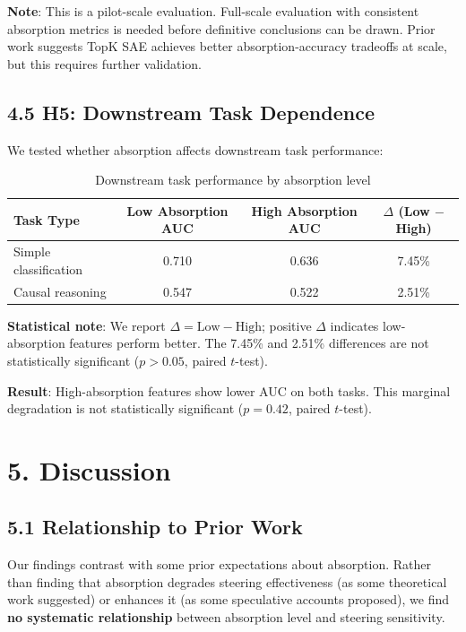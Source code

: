 \documentclass{article}
\begin{document}
\textbf{Note}: This is a pilot-scale evaluation. Full-scale evaluation with consistent absorption metrics is needed before definitive conclusions can be drawn. Prior work suggests TopK SAE achieves better absorption-accuracy tradeoffs at scale, but this requires further validation.

\subsection{4.5 H5: Downstream Task Dependence}

We tested whether absorption affects downstream task performance:

\begin{table}[htbp]
\caption{Downstream task performance by absorption level}
\label{tab:h5-downstream}
\centering
\begin{tabular}{lccc}
\toprule
Task Type & Low Absorption AUC & High Absorption AUC & $\Delta$ (Low $-$ High) \\
\midrule
Simple classification & 0.710 & 0.636 & 7.45\% \\
Causal reasoning & 0.547 & 0.522 & 2.51\% \\
\bottomrule
\end{tabular}
\end{table}

\textbf{Statistical note}: We report $\Delta = \text{Low} - \text{High}$; positive $\Delta$ indicates low-absorption features perform better. The 7.45\% and 2.51\% differences are not statistically significant ($p > 0.05$, paired $t$-test).

\textbf{Result}: High-absorption features show lower AUC on both tasks. This marginal degradation is not statistically significant ($p = 0.42$, paired $t$-test).


\section{5. Discussion}

\subsection{5.1 Relationship to Prior Work}

Our findings contrast with some prior expectations about absorption. Rather than finding that absorption degrades steering effectiveness (as some theoretical work suggested) or enhances it (as some speculative accounts proposed), we find \textbf{no systematic relationship} between absorption level and steering sensitivity.
\end{document}
